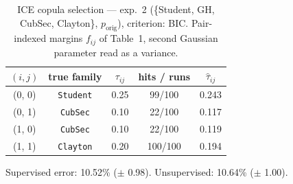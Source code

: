 \begin{table}[htbp]
  \centering
  \caption{ICE copula selection — exp.\ 2 (\{Student, GH, CubSec, Clayton\}, $p_{\text{orig}}$), criterion: BIC. Pair-indexed margins $f_{ij}$ of Table~1, second Gaussian parameter read as a variance.}
  \label{tab:exp3-exp2_orig_p__bic}
  \begin{tabular}{ccccc}
    \toprule
    $(i, j)$ & true family & $\tau_{ij}$ & hits / runs & $\hat\tau_{ij}$ \\
    \midrule
    (0, 0) & \texttt{Student} & 0.25 & 99/100 & 0.243 \\
    (0, 1) & \texttt{CubSec} & 0.10 & 22/100 & 0.117 \\
    (1, 0) & \texttt{CubSec} & 0.10 & 22/100 & 0.119 \\
    (1, 1) & \texttt{Clayton} & 0.20 & 100/100 & 0.194 \\
    \bottomrule
  \end{tabular}
  \par\smallskip Supervised error: 10.52\% ($\pm$ 0.98). Unsupervised: 10.64\% ($\pm$ 1.00).
\end{table}
